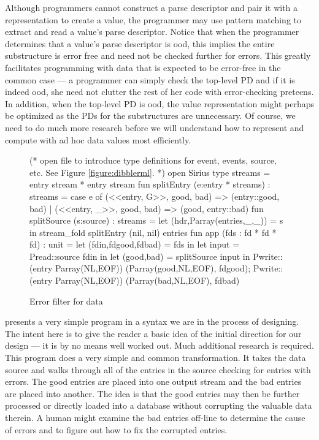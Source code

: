\documentclass[11pt]{article}
\begin{document}
\noindent
Although programmers cannot construct a parse descriptor and pair it with a
representation to create a value, the programmer may use pattern matching
to extract and read a value's parse descriptor.  Notice that
when the programmer determines that a value's parse descriptor is
ood, this implies the entire substructure is error free
and need not be checked further for errors.  This 
greatly facilitates programming with data that is expected
to be error-free in the common case ---  a programmer can simply check 
the top-level PD and if it is indeed ood,
she need not clutter the rest of her code with error-checking
preteens.  In addition, when the top-level PD is ood,
the value representation might perhaps be optimized as the
PDs for the substructures are unnecessary.  Of course, we
need to do much more research before we will understand how to 
represent and compute with ad hoc data values most efficiently.


\begin{figure}
\begin{code}
(* open file to introduce \dibbler type definitions for
   event, events, source, etc.  See Figure \ref{figure:dibblerml}. *) 
\mbox{}
open Sirius
\mbox{}
type streams = entry stream * entry stream
\mbox{}
fun splitEntry (e:entry * streams) : streams =
  case e of
    (<<entry, G>>, good, bad) => (entry::good, bad)
  | (<<entry, _>>, good, bad) => (good, entry::bad)
\mbox{}    
fun splitSource (s:source) : streams =
    let (hdr,Parray(entries,_,_)) = s in 
    stream\_fold splitEntry (nil, nil) entries
\mbox{}
fun app (fds : fd * fd * fd) : unit =  
  let (fdin,fdgood,fdbad) = fds                in
  let input               = Pread::source fdin in
  let (good,bad)          = splitSource input  in
  Pwrite::(entry Parray(NL,EOF)) (Parray(good,NL,EOF), fdgood);
  Pwrite::(entry Parray(NL,EOF)) (Parray(bad,NL,EOF), fdbad)
\end{code}
\caption{Error filter for \dibbler{} data}
\label{figure:newick-clean}
\end{figure}


 presents a very simple \datatype{}
program in a syntax we are in the process of designing.  The
intent here is to give the reader a basic idea of the initial direction
for our design --- it is by no means well worked out.  Much additional
research is required.  This program does a very simple and common
transformation.  It takes the \dibbler{} data source and
walks through all of the entries in the source checking for
entries with errors.  The good entries are placed into
one output stream and the bad entries are placed into another.
The idea is that the good entries may then be further processed
or directly loaded into a database without corrupting
the valuable data therein.  A human might examine
the bad entries off-line to determine the cause of errors
and to figure out how to fix the corrupted entries.
\end{document}
